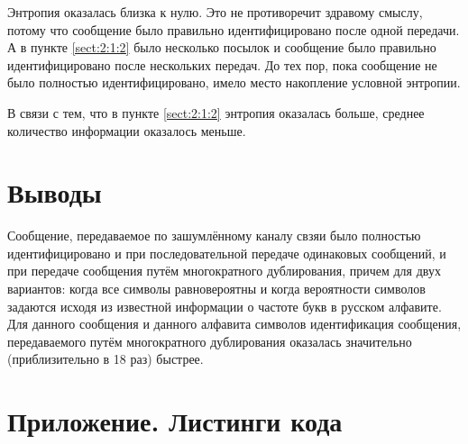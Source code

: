 Энтропия оказалась близка к нулю. Это не противоречит здравому смыслу, потому что сообщение было правильно идентифицировано после одной передачи. А в пункте \ref{sect:2:1:2} было несколько посылок и сообщение было правильно идентифицировано после нескольких передач. До тех пор, пока сообщение не было полностью идентифицировано, имело место накопление условной энтропии.

В связи с тем, что в пункте \ref{sect:2:1:2} энтропия оказалась больше, среднее количество информации оказалось меньше.

\newpage

\section{Выводы}

Сообщение, передаваемое по зашумлённому каналу свзяи было полностью идентифицировано и при последовательной передаче одинаковых сообщений, и при передаче сообщения путём многократного дублирования, причем для двух вариантов: когда все символы равновероятны и когда вероятности символов задаются исходя из известной информации о частоте букв в русском алфавите. Для данного сообщения и данного алфавита символов идентификация сообщения, передаваемого путём многократного дублирования оказалась значительно (приблизительно в 18 раз) быстрее.

\newpage
\section{Приложение. Листинги кода}


\parindent=1cm

\newpage


\parindent=1cm

\newpage


\parindent=1cm


\parindent=1cm


\parindent=1cm


\parindent=1cm

\newpage


\parindent=1cm


\parindent=1cm

\newpage


\parindent=1cm


